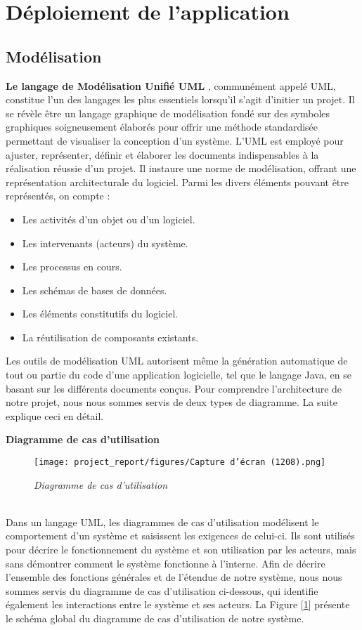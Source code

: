 \section{Déploiement de l'application}
\subsection{Modélisation}
\textbf{Le langage de Modélisation Unifié UML}
, communément appelé UML, constitue l'un des langages les plus essentiels lorsqu'il s'agit d'initier un projet. Il se révèle être un langage graphique de modélisation fondé sur des symboles graphiques soigneusement élaborés pour offrir une méthode standardisée permettant de visualiser la conception d'un système.
L'UML est employé pour ajuster, représenter, définir et élaborer les documents indispensables à la réalisation réussie d'un projet. Il instaure une norme de modélisation, offrant une représentation architecturale du logiciel. Parmi les divers éléments pouvant être représentés, on compte :
\begin{itemize}
    \item Les activités d'un objet ou d'un logiciel.
    \item Les intervenants (acteurs) du système.
    \item Les processus en cours.
    \item Les schémas de bases de données.
    \item Les éléments constitutifs du logiciel.
    \item La réutilisation de composants existants.
\end{itemize}
Les outils de modélisation UML autorisent même la génération automatique de tout ou partie du code d'une application logicielle, tel que le langage Java, en se basant sur les différents documents conçus.
Pour comprendre l'architecture de notre projet, nous nous sommes servis de deux types de diagramme. La suite explique ceci en détail. \par
\textbf{Diagramme de cas d'utilisation}
\begin{figure}[h]
    \centering
    \texttt{[image: project\_report/figures/Capture d’écran (1208).png]}
    \caption{\textit{Diagramme de cas d'utilisation}}
    \label{fig:figUsecase}
\end{figure}
\\Dans un langage UML, les diagrammes de cas d'utilisation modélisent le comportement d'un système et saisissent les exigences de celui-ci. Ils sont utilisés pour décrire le fonctionnement du système et son utilisation par les acteurs, mais sans démontrer comment le système fonctionne à l'interne.
Afin de décrire l'ensemble des fonctions générales et de l'étendue de notre système, nous nous sommes servis du diagramme de cas d'utilisation ci-dessous, qui identifie également les interactions entre le système et ses acteurs.
La Figure [\ref{fig:figUsecase}] présente le schéma global du diagramme de cas d'utilisation de notre système. 


